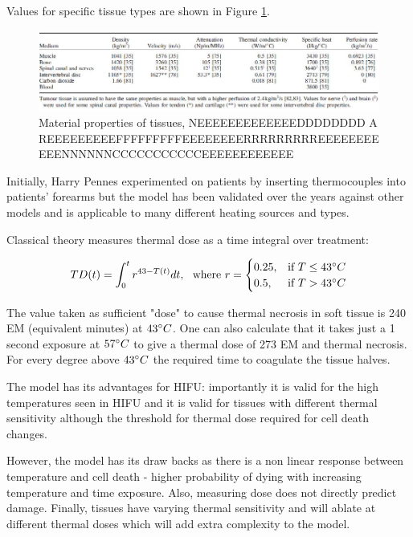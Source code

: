 \documentclass[11pt]{article} %
\begin{document}
	Values for specific tissue types are shown in Figure \ref{fig:tissueproperties}. 
	
	\begin{figure}
		\centering
		\includegraphics[width=1\linewidth]{Report_images/tissueproperties}
		\caption{Material properties of tissues, NEEEEEEEEEEEEEDDDDDDDD A REEEEEEEEEFFFFFFFFFEEEEEEEERRRRRRRRREEEEEEEEEEENNNNNNCCCCCCCCCCCEEEEEEEEEEEE}
		\label{fig:tissueproperties}
	\end{figure}
	
	Initially, Harry Pennes experimented on patients by inserting thermocouples into patients' forearms but the model has been validated over the years against other models and is applicable to many different heating sources and types.
	
	
	
	
	Classical theory \cite{Sapareto1984a}  measures thermal dose as a time integral over treatment:
	
\begin{equation}
TD(t)=\int_{0}^{t}r^{43-T(t)}dt,\ \ \text{where  } r=
\begin{cases}
0.25, & \text{if}\ T\leq 43 \degree C \\
0.5, & \text{if}\ T>43 \degree C
\end{cases}
\end{equation}
	
	The value taken as sufficient "dose" to cause thermal necrosis in soft tissue is 240 EM (equivalent minutes) at $43 \degree C $. One can also calculate that it takes just a 1 second exposure at $57 \degree C $ to give a thermal dose of 273 EM and thermal necrosis. For every degree above  $43 \degree C $ the required time to coagulate the tissue halves. 
	
	The model has its advantages for HIFU: importantly it is valid for the high temperatures seen in HIFU and it is valid for tissues with different thermal sensitivity although the threshold for thermal dose required for cell death changes. 
	
	However, the model has its draw backs as there is a non linear response between temperature and cell death - higher probability of dying with increasing temperature and time exposure. Also, measuring dose does not directly predict damage. Finally, tissues have varying thermal sensitivity and will ablate at different thermal doses which will add extra complexity to the model.
	
\end{document}
